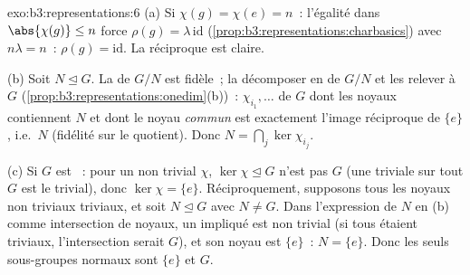 \begin{solution}{exo:b3:representations:6}
(a) Si $\chi(g) = \chi(e) = n$~: l'égalité dans $\abs{\chi(g)}
\leq n$ force $\rho(g) = \lambda\,\mathrm{id}$
(\cref{prop:b3:representations:charbasics}) avec $n\lambda =
n$~: $\rho(g) = \mathrm{id}$. La réciproque est claire.

(b) Soit $N \trianglelefteq G$. La  de
$G/N$ est fidèle~; la décomposer en  de $G/N$ et
les relever à $G$ (\cref{prop:b3:representations:onedim}(b))~:
  $\chi_{i_1}, \dots$ de $G$ dont les
noyaux contiennent $N$ et dont le noyau \emph{commun} est
exactement l'image réciproque de $\{e\}$, i.e.\ $N$ (fidélité
sur le quotient). Donc $N = \bigcap_j \ker\chi_{i_j}$.

(c) Si $G$ est ~: pour un  non trivial $\chi$,
$\ker\chi \trianglelefteq G$ n'est pas $G$ (une  triviale sur tout $G$ est le  trivial),
donc $\ker\chi = \{e\}$. Réciproquement, supposons tous les
noyaux non triviaux triviaux, et soit $N \trianglelefteq G$ avec
$N \neq G$. Dans l'expression de $N$ en (b) comme intersection
de noyaux, un  impliqué est non trivial (si tous
étaient triviaux, l'intersection serait $G$), et son noyau est
$\{e\}$~: $N = \{e\}$. Donc les seuls sous-groupes normaux sont
$\{e\}$ et $G$.
\end{solution}

